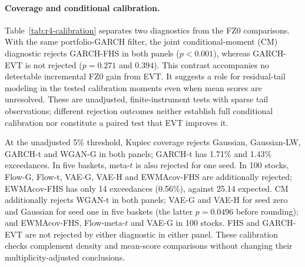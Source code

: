 \documentclass[11pt]{article}
\theoremstyle{definition}\newtheorem{definition}[theorem]{Definition}
\theoremstyle{remark}\newtheorem{remark}[theorem]{Remark}
\begin{document}
\FloatBarrier

\paragraph{Coverage and conditional calibration.}
Table~\ref{tab:r4-calibration} separates two diagnostics from the FZ0 comparisons. With the same portfolio-GARCH filter, the joint conditional-moment (CM) diagnostic rejects GARCH-FHS in both panels ($p<0.001$), whereas GARCH-EVT is not rejected ($p=0.271$ and $0.394$). This contrast accompanies no detectable incremental FZ0 gain from EVT. It suggests a role for residual-tail modeling in the tested calibration moments even when mean scores are unresolved. These are unadjusted, finite-instrument tests with sparse tail observations; different rejection outcomes neither establish full conditional calibration nor constitute a paired test that EVT improves it.

At the unadjusted 5\% threshold, Kupiec coverage rejects Gaussian, Gaussian-LW, GARCH-t and WGAN-G in both panels; GARCH-t has 1.71\% and 1.43\% exceedances. In five baskets, meta-$t$ is also rejected for one seed. In 100 stocks, Flow-G, Flow-t, VAE-G, VAE-H and EWMAcov-FHS are additionally rejected; EWMAcov-FHS has only 14 exceedances (0.56\%), against 25.14 expected. CM additionally rejects WGAN-t in both panels; VAE-G and VAE-H for seed zero and Gaussian for seed one in five baskets (the latter $p=0.0496$ before rounding); and EWMAcov-FHS, Flow-meta-$t$ and VAE-G in 100 stocks. FHS and GARCH-EVT are not rejected by either diagnostic in either panel. These calibration checks complement density and mean-score comparisons without changing their multiplicity-adjusted conclusions.
\end{document}
